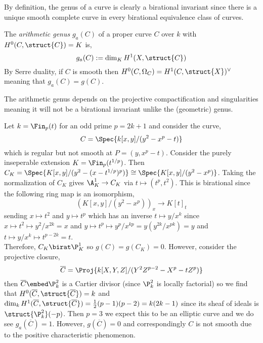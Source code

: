 \begin{rmk}
By definition, the genus of a curve is clearly a birational invariant since there is a unique smooth complete curve in every birational equivalence class of curves. 
\end{rmk}

\begin{defn}
The \textit{arithmetic genus} $g_a(C)$ of a proper curve $C$ over $k$ with $H^0(C, \struct{C}) = K$ is,
\[ g_a(C) := \dim_K H^1(X, \struct{C}) \]
By Serre duality, if $C$ is smooth then $H^0(C, \Omega_C) = H^1(C, \struct{X})^\vee$ meaning that $g_a(C) = g(C)$. 
\end{defn}

\begin{rmk}
The arithmetic genus depends on the projective compactification and singularities meaning it will not be a birational invariant unlike the (geometric) genus. 
\end{rmk}

\begin{example}
Let $k = \Fin_p(t)$ for an odd prime $p = 2k + 1$ and consider the curve,
\[ C = \Spec{k[x,y]/(y^2 - x^p - t)} \]
which is regular but not smooth at $P = (y, x^p - t)$. Consider the purely inseperable extension $K = \Fin_p(t^{1/p})$. Then $C_K = \Spec{K[x,y]/(y^2 - (x - t^{1/p})^p)} \cong \Spec{K[x,y]/(y^2 - x^p)}$. Taking the normalization of $C_K$ gives $\A^1_K \to C_K$ via $t \mapsto (t^p, t^2)$. This is birational since the following ring map is an isomorphism,
\[ (K[x,y]/(y^2 - x^p))_{x} \to K[t]_{t} \]
sending $x \mapsto t^2$ and $y \mapsto t^p$ which has an inverse $t \mapsto y/x^k$ since $x \mapsto t^2 \mapsto y^2/x^{2k} = x$ and $y \mapsto t^p \mapsto y^{p}/x^{kp} = y (y^{2k}/x^{pk}) = y$ and $t \mapsto y/x^k \mapsto t^{p - 2k} = t$. 
\bigskip\\
Therefore, $C_K \birat \P^1_K$ so $g(C) = g(C_K) = 0$. However, consider the projective closure,
\[ \overline{C} = \Proj{k[X,Y,Z]/(Y^2 Z^{p-2} - X^p - t Z^p)} \]
then $\overline{C} \embed \P^2_k$ is a Cartier divisor (since $\P^2_k$ is locally factorial) so we find that $H^0(\overline{C}, \struct{\overline{C}}) = k$ and $\dim_k H^1(\overline{C}, \struct{\overline{C}}) = \tfrac{1}{2}(p-1)(p-2) = k (2k - 1)$ since its sheaf of ideals is $\struct{\P^2_k}(-p)$. Then $p = 3$ we expect this to be an elliptic curve and we do see $g_a(\overline{C}) = 1$. However, $g(\overline{C}) = 0$ and correspondingly $C$ is not smooth due to the positive characteristic phenomenon. 
\end{example}

